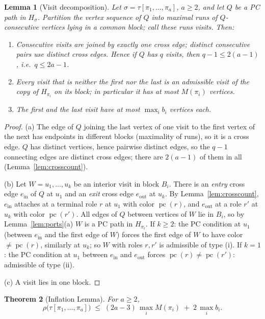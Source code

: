 \documentclass[11pt]{article}
\newtheorem{theorem}{Theorem}[section]
\newtheorem{lemma}[theorem]{Lemma}
\theoremstyle{definition}
\DeclareMathOperator{\pc}{pc}
\begin{document}
\begin{lemma}[Visit decomposition]\label{lem:visits}
Let $\sigma = \tau[\pi_1, \dots, \pi_a]$, $a \ge 2$, and let $Q$ be a PC path in
$H_\sigma$. Partition the vertex sequence of $Q$ into maximal runs of $Q$-consecutive
vertices lying in a common block; call these runs \emph{visits}. Then:
\begin{enumerate}
\item[(a)] Consecutive visits are joined by exactly one cross edge; distinct
consecutive pairs use distinct cross edges. Hence if $Q$ has $q$ visits, then
$q - 1 \le 2(a-1)$, i.e.\ $q \le 2a - 1$.
\item[(b)] Every visit that is neither the first nor the last is an admissible visit of
the copy of $H_{\pi_i}$ on its block; in particular it has at most $M(\pi_i)$ vertices.
\item[(c)] The first and the last visit have at most $\max_i b_i$ vertices each.
\end{enumerate}
\end{lemma}

\begin{proof}
(a) The edge of $Q$ joining the last vertex of one visit to the first vertex of the
next has endpoints in different blocks (maximality of runs), so it is a cross edge. $Q$
has distinct vertices, hence pairwise distinct edges, so the $q-1$ connecting edges are
distinct cross edges; there are $2(a-1)$ of them in all (Lemma~\ref{lem:crosscount}).

(b) Let $W = u_1, \dots, u_k$ be an interior visit in block $B_i$. There is an
\emph{entry} cross edge $e_{\mathrm{in}}$ of $Q$ at $u_1$ and an \emph{exit} cross edge
$e_{\mathrm{out}}$ at $u_k$. By Lemma~\ref{lem:crosscount}, $e_{\mathrm{in}}$ attaches
at a terminal role $r$ at $u_1$ with color $\pc(r)$, and $e_{\mathrm{out}}$ at a role
$r'$ at $u_k$ with color $\pc(r')$. All edges of $Q$ between vertices of $W$ lie in
$B_i$, so by Lemma~\ref{lem:ports}(a) $W$ is a PC path in $H_{\pi_i}$. If $k \ge 2$:
the PC condition at $u_1$ (between $e_{\mathrm{in}}$ and the first edge of $W$) forces
the first edge of $W$ to have color $\ne \pc(r)$, similarly at $u_k$; so $W$ with roles
$r,r'$ is admissible of type (i). If $k = 1$: the PC condition at $u_1$ between
$e_{\mathrm{in}}$ and $e_{\mathrm{out}}$ forces $\pc(r) \ne \pc(r')$: admissible of
type (ii).

(c) A visit lies in one block.
\end{proof}

\begin{theorem}[Inflation Lemma]\label{thm:inflation}
For $a \ge 2$,
\[
\rho\bigl(\tau[\pi_1, \dots, \pi_a]\bigr)
\;\le\;
(2a - 3)\,\max_i M(\pi_i) \;+\; 2\,\max_i b_i .
\]
\end{theorem}
\end{document}
